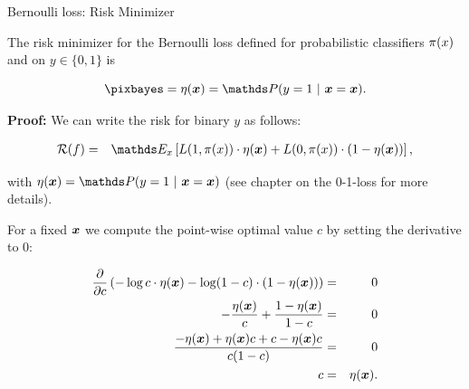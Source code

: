 \begin{vbframe}{Bernoulli loss: Risk Minimizer}

The risk minimizer for the Bernoulli loss defined for probabilistic classifiers $\pi(x)$ and on $y \in \{0, 1\}$ is

$$
  \pixbayes = \eta(\xv) = \P(y = 1 ~|~ \xv = \xv). 
$$

\vspace*{0.2cm}

\begin{footnotesize}
\textbf{Proof:} We can write the risk for binary $y$ as follows: 





\vspace*{-0.3cm}

\begin{eqnarray*}
  \riskf &=& \E_x \left[L(1, \pix) \cdot \eta(\xv) + L(0, \pix) \cdot (1 - \eta(\xv)) \right],
\end{eqnarray*}

with $\eta(\xv) = \P(y = 1 ~|~ \xv = \xv)$ (see chapter on the 0-1-loss for more details). 

For a fixed $\bm{x}$ we compute the point-wise optimal value $c$ by setting the derivative to $0$: 

\vspace*{-0.3cm}

\begin{eqnarray*}
  \frac{\partial }{\partial c} \left(- \log c  \cdot \eta(\bm{x})- \log (1 - c) \cdot (1 - \eta(\bm{x}))\right) &=& 0 \\
  - \frac{\eta(\bm{x})}{c} + \frac{1 - \eta(\bm{x})}{1 - c} &=& 0 \\
  \frac{- \eta(\bm{x}) + \eta(\bm{x}) c + c - \eta(\bm{x}) c}{c (1 - c)} &=& 0 \\
  c &=& \eta(\bm{x}). 
\end{eqnarray*}


\end{footnotesize}
\end{vbframe}
